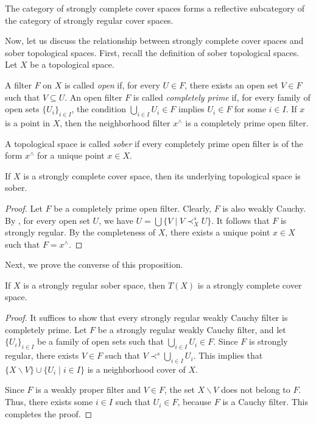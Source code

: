 \documentclass[pdflatex,sn-mathphys-num]{sn-jnl}
\theoremstyle{definition}
\theoremstyle{remark}
\numberwithin{figure}{section}
\newcommand{\rb}{\prec}
\begin{document}
\begin{cor}
The category of strongly complete cover spaces forms a reflective subcategory of the category of strongly regular cover spaces.
\end{cor}

Now, let us discuss the relationship between strongly complete cover spaces and sober topological spaces.
First, recall the definition of sober topological spaces.
Let $X$ be a topological space.

A filter $F$ on $X$ is called \emph{open} if, for every $U \in F$, there exists an open set $V \in F$ such that $V \subseteq U$.
An open filter $F$ is called \emph{completely prime} if, for every family of open sets $\{ U_i \}_{i \in I}$, the condition $\bigcup_{i \in I} U_i \in F$ implies $U_i \in F$ for some $i \in I$.
If $x$ is a point in $X$, then the neighborhood filter $x^\wedge$ is a completely prime open filter.

A topological space is called \emph{sober} if every completely prime open filter is of the form $x^\wedge$ for a unique point $x \in X$.

\begin{prop}[u-sober]
If $X$ is a strongly complete cover space, then its underlying topological space is sober.
\end{prop}
\begin{proof}
Let $F$ be a completely prime open filter.
Clearly, $F$ is also weakly Cauchy.
By , for every open set $U$, we have $U = \bigcup \{ V \mid V \rb^s_X U \}$.
It follows that $F$ is strongly regular.
By the completeness of $X$, there exists a unique point $x \in X$ such that $F = x^\wedge$.
\end{proof}

Next, we prove the converse of this proposition.

\begin{prop}[t-complete]
If $X$ is a strongly regular sober space, then $T(X)$ is a strongly complete cover space.
\end{prop}
\begin{proof}
It suffices to show that every strongly regular weakly Cauchy filter is completely prime.
Let $F$ be a strongly regular weakly Cauchy filter, and let $\{ U_i \}_{i \in I}$ be a family of open sets such that $\bigcup_{i \in I} U_i \in F$.
Since $F$ is strongly regular, there exists $V \in F$ such that $V \rb^s \bigcup_{i \in I} U_i$.
This implies that $\{ X \backslash V \} \cup \{ U_i \mid i \in I \}$ is a neighborhood cover of $X$.

Since $F$ is a weakly proper filter and $V \in F$, the set $X \backslash V$ does not belong to $F$.
Thus, there exists some $i \in I$ such that $U_i \in F$, because $F$ is a Cauchy filter.
This completes the proof.
\end{proof}
\end{document}
